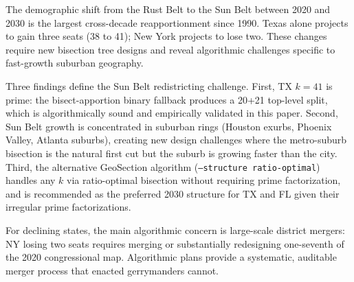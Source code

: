The demographic shift from the Rust Belt to the Sun Belt between 2020 and 2030 is
the largest cross-decade reapportionment since 1990. Texas alone projects to gain
three seats (38 to 41); New York projects to lose two. These changes require new
bisection tree designs and reveal algorithmic challenges specific to fast-growth
suburban geography.

Three findings define the Sun Belt redistricting challenge.
First, TX $k = 41$ is prime: the bisect-apportion binary fallback produces a
20+21 top-level split, which is algorithmically sound and empirically validated
in this paper.
Second, Sun Belt growth is concentrated in suburban rings (Houston exurbs, Phoenix
Valley, Atlanta suburbs), creating new design challenges where the metro-suburb
bisection is the natural first cut but the suburb is growing faster than the city.
Third, the alternative GeoSection algorithm (\texttt{--structure ratio-optimal})
handles any $k$ via ratio-optimal bisection without requiring prime factorization,
and is recommended as the preferred 2030 structure for TX and FL given their
irregular prime factorizations.

For declining states, the main algorithmic concern is large-scale district mergers:
NY losing two seats requires merging or substantially redesigning one-seventh of
the 2020 congressional map. Algorithmic plans provide a systematic, auditable merger
process that enacted gerrymanders cannot.
